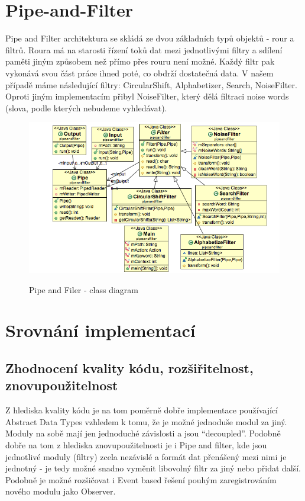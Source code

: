 \documentclass[11pt]{article}
\begin{document}
\section{Pipe-and-Filter}

Pipe and Filter architektura se skládá ze dvou základních typů objektů - rour a filtrů. Roura má na starosti řízení toků dat mezi jednotlivými filtry a sdílení paměti jiným způsobem než přímo přes rouru není možné. Každý filtr pak vykonává svou část práce ihned poté, co obdrží dostatečná data. V našem případě máme následující filtry: CircularShift, Alphabetizer, Search, NoiseFilter.  Oproti jiným implementacím přibyl NoiseFilter, který dělá filtraci noise words (slova, podle kterých nebudeme vyhledávat).

\begin{figure}[htbp]
	\caption{Pipe and Filer - class diagram}
		\includegraphics[width=13cm]{pipe}
	\label{fig:pipe}
\end{figure}

\section{Srovnání implementací}

\subsection{Zhodnocení kvality kódu, rozšiřitelnost, znovupoužitelnost}

Z hlediska kvality kódu je na tom poměrně dobře implementace používající Abstract Data Types vzhledem k tomu, že je možné jednoduše modul za jiný. Moduly na sobě mají jen jednoduché závislosti a jsou “decoupled”. Podobně dobře na tom z hlediska znovupoužitelnosti je i Pipe and filter, kde jsou jednotlivé moduly (filtry) zcela nezávislé a formát dat přenášený mezi nimi je jednotný - je tedy možné snadno vyměnit libovolný filtr za jiný nebo přidat další. Podobně je možné rozšičovat i Event based řešení pouhým zaregistrováním nového modulu jako Observer.
\end{document}
